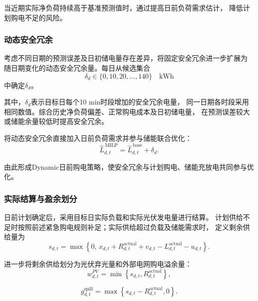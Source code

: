 当近期实际净负荷持续高于基准预测值时，通过提高日前负荷需求估计，
降低计划购电不足的风险。


\subsubsection{动态安全冗余}

考虑不同日期的预测误差及日初储电量存在差异，将固定安全冗余进一步扩展为
随日期变化的动态安全冗余量。每日从候选集合
\begin{equation}
\delta_d
\in
\{0,10,20,\ldots,140\}
\quad \mathrm{kWh}
\label{eq:p2_delta_set}
\end{equation}
中确定$\delta_d$。

其中，$\delta_d$表示目标日每个10 min时段增加的安全冗余电量，
同一日期各时段采用相同数值。综合历史净负荷偏差、正常购电成本及日初储电量，
在预测误差较大或储能余量较低时提高安全冗余。

将动态安全冗余直接加入日前负荷需求并参与储能联合优化：
\begin{equation}
\hat L_{d,t}^{\,\mathrm{MILP}}
=
\hat L_{d,t}^{\,\mathrm{base}}
+\delta_d.
\label{eq:p2_dynamic_reserve}
\end{equation}

由此形成Dynamic日前购电策略，使安全冗余与计划购电、储能充放电共同参与优化。


\subsubsection{实际结算与盈余划分}

日前计划确定后，采用目标日实际负载和实际光伏发电量进行结算。
计划供给不足时按照前述紧急购电规则补足；实际供给超过负载及储能需求时，
定义剩余供给量为
\begin{equation}
s_{d,t}
=
\max\left\{
0,\,
x_{d,t}+R_{d,t}^{\mathrm{actual}}+v_{d,t}
-L_{d,t}^{\mathrm{actual}}-u_{d,t}
\right\}.
\label{eq:p2_surplus}
\end{equation}

进一步将剩余供给划分为光伏弃光量和外部电网购电溢余量：
\begin{equation}
w_{d,t}^{PV}
=
\min\left\{
s_{d,t},R_{d,t}^{\mathrm{actual}}
\right\},
\label{eq:p2_pv_curtailment}
\end{equation}

\begin{equation}
g_{d,t}^{\mathrm{spill}}
=
\max\left\{
s_{d,t}-R_{d,t}^{\mathrm{actual}},0
\right\}.
\label{eq:p2_grid_spill}
\end{equation}

